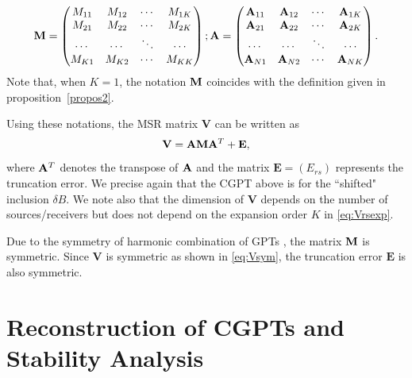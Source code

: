\begin{equation}
\mathbf{M} = \begin{pmatrix}
M_{11} & M_{12} & \cdots & M_{1K}\\
M_{21} & M_{22} & \cdots & M_{2K}\\
\cdots & \cdots & \ddots & \cdots\\
M_{K1} & M_{K2} & \cdots & M_{KK}
\end{pmatrix};
\mathbf{A} = \begin{pmatrix}
\mathbf{A}_{11} & \mathbf{A}_{12} & \cdots & \mathbf{A}_{1K}\\
\mathbf{A}_{21} & \mathbf{A}_{22} & \cdots & \mathbf{A}_{2K}\\
\cdots & \cdots & \ddots & \cdots\\
\mathbf{A}_{N1} & \mathbf{A}_{N2} & \cdots & \mathbf{A}_{NK}
\end{pmatrix}.
\label{eq:Mcgpt}
\end{equation}
Note that, when $K=1$, the notation $\mathbf{M}$ coincides with the definition
given in proposition~\ref{propos2}.

Using these notations, the MSR matrix $\mathbf{V}$ can be written
as
\begin{equation}
\mathbf{V} = \mathbf{A}  \mathbf{M} \mathbf{A}^T+ \mathbf{E}, \label{eq:Vexp}
\end{equation}
where $\mathbf{A}^T$ denotes the transpose of $\mathbf{A}$ and the matrix
$\mathbf{E} = (E_{rs})$ represents the truncation error. We
precise again that the CGPT above is for the ``shifted" inclusion
$\delta B$. We note also that the dimension of $\mathbf{V}$
depends on the number of sources/receivers but does not depend on
the expansion order $K$ in \eqref{eq:Vrsexp}.

Due to the symmetry of harmonic combination of GPTs
\cite{ammari2007polarization}, the matrix $\mathbf{M}$ is symmetric.
Since $\mathbf{V}$ is symmetric as shown in \eqref{eq:Vsym}, the
truncation error $\mathbf{E}$ is also symmetric.

\section{Reconstruction of CGPTs and Stability Analysis}\label{sec:reconstr-cgpt-stab}

